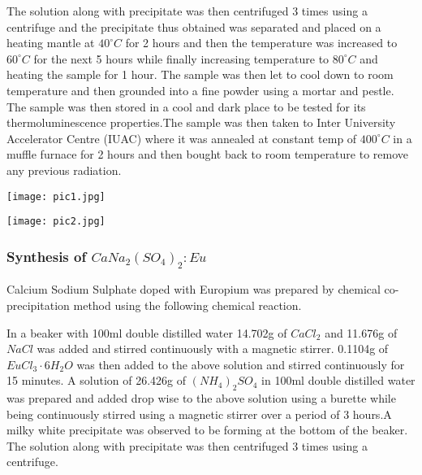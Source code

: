 \documentclass[../experiment.tex]{subfiles}
\begin{document}
        The solution along with precipitate was then centrifuged 3 times using a centrifuge and the precipitate
        thus obtained was separated and placed on a heating mantle at $40^{\circ}C$ for 2 hours and then the temperature was
        increased to $60^{\circ}C$ for the next 5 hours while finally increasing temperature to $80^{\circ}C$ and heating the sample for
        1 hour. The sample was then let to cool down to room temperature and then grounded into a fine powder using
        a mortar and pestle. The sample was then stored in a cool and dark place to be tested for its thermoluminescence
        properties.The sample was then taken to Inter University Accelerator Centre (IUAC) where it was annealed at
        constant temp of $400^{\circ}C$ in a muffle furnace for 2 hours and then bought back to room temperature to remove
        any previous radiation.
        \pagebreak
        \FloatBarrier\begin{multicols}{2}
            \begin{Figure}
                \centering
                \texttt{[image: pic1.jpg]}
                \label{fig:pic1}
            \end{Figure}
            \begin{Figure}
                \centering
                \texttt{[image: pic2.jpg]}
                \label{fig:pic2}
            \end{Figure}
        \end{multicols}
    \subsubsection{Synthesis of $CaNa_2{(SO_4)}_2:Eu$}
        Calcium Sodium Sulphate doped with Europium was prepared by chemical co-precipitation method using the following chemical reaction.
        \begin{center}
        \end{center}
        In a beaker with 100ml double distilled water 14.702g of $CaCl_2$ and 11.676g of $NaCl$ was added and stirred
        continuously with a magnetic stirrer. 0.1104g of $EuCl_{3}{\cdot}6H_2O$ was then added to the 
        above solution and stirred continuously for 15 minutes. A solution of 26.426g of ${(NH_4)}_{2}SO_4$ in 100ml double distilled water was prepared
        and added drop wise to the above solution using a burette while being continuously stirred using a magnetic
        stirrer over a period of 3 hours.A milky white precipitate was observed to be forming at the bottom of the
        beaker. The solution along with precipitate was then centrifuged 3 times using a centrifuge.
\end{document}
